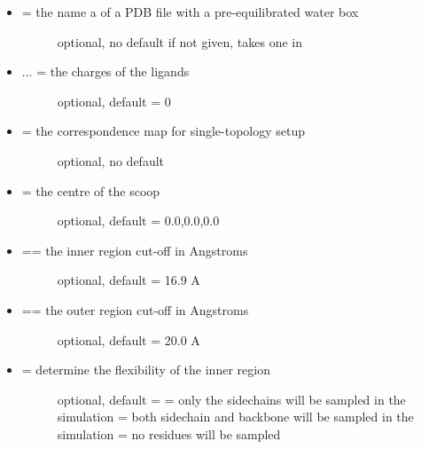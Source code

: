 \documentclass[letterpaper,10pt,english]{manual}
\begin{document}
\begin{itemize}
\item {} \begin{description}
\item[{ = the name a of a PDB file with a pre-equilibrated water box}] \leavevmode
optional, no default
if not given, takes one in 

\end{description}

\item {} \begin{description}
\item[{ ... = the charges of the ligands}] \leavevmode
optional, default = 0

\end{description}

\item {} \begin{description}
\item[{ = the correspondence map for single-topology setup}] \leavevmode
optional, no default

\end{description}

\item {} \begin{description}
\item[{ = the centre of the scoop}] \leavevmode
optional, default = 0.0,0.0,0.0

\end{description}

\item {} \begin{description}
\item[{ == the inner region cut-off in Angstroms}] \leavevmode
optional, default = 16.9 A

\end{description}

\item {} \begin{description}
\item[{ == the outer region cut-off in Angstroms}] \leavevmode
optional, default = 20.0 A

\end{description}

\item {} \begin{description}
\item[{ = determine the flexibility of the inner region}] \leavevmode
optional, default = 
 = only the sidechains will be sampled in the simulation
 = both sidechain and backbone will be sampled in the simulation
 = no residues will be sampled


\end{description}
\end{itemize}
\end{document}
